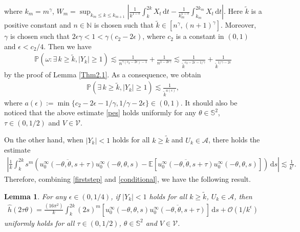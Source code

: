 \documentclass[reqno, 12pt]{amsart}
\newtheorem{Le}{Lemma}[section]
\numberwithin{equation}{section}
\begin{document}
where $k_m=m^\gamma$, $W_m=\sup_{k_m \le k \le k_{m+1}} \left|\frac{1}{k^{1-\epsilon}} \int_k^{2k} X_t \,\mathrm{d}t-\frac{1}{k_m^{1-\epsilon}} \int_{k_m}^{2k_m} X_t \,\mathrm{d}t \right|$. Here $\tilde k$ is a positive constant and $n \in \mathbb N$ is chosen such that $\tilde k \in [n^\gamma, (n+1)^\gamma]$. Moreover, $\gamma$ is chosen such that $2\epsilon\gamma<1<\gamma(c_2-2\epsilon)$, where $c_2$ is a constant in $ (0,1)$ and $\epsilon <c_2/4$. Then we have \begin{align*}
    \mathbb P(\omega: \exists \,k \ge \tilde k, |Y_{ k}| \ge 1) \lesssim \frac{1}{n^{\gamma(c_2-2\epsilon)-1}}+\frac{1}{n^{1-2\epsilon\gamma}} \lesssim \frac{1}{{\tilde k}^{c_2-2\epsilon-1/\gamma}}+\frac{1}{{\tilde k}^{1/\gamma-2\epsilon}} 
\end{align*} by the proof of Lemma \ref{Thm2.1}. As a consequence, we obtain \begin{align}\label{pes}
    \mathbb P(\exists \, k \ge \tilde k, |Y_{k}| \ge 1) \lesssim  \frac{1}{\tilde k^{a(\epsilon)}},
\end{align} where $a(\epsilon):=\min\{c_2-2\epsilon-1/\gamma,1/\gamma-2\epsilon\} \in (0,1)$. It should also be noticed that the above estimate \eqref{pes} holds uniformly for any $\theta \in \mathbb S^2$, $\tau \in (0,1/2)$ and $V \in\mathcal V.$

On the other hand, when $|Y_{k}| < 1$ holds for all $k \ge \tilde k$ and $U_{ k} \in \mathcal A$, there holds the estimate \begin{align}\label{conditional}
    \left|\frac{1}{ k}\int_{k}^{2 k}s^{m}(\overline{u_0^\infty(-\theta,\theta, s+\tau)} u_0^\infty(-\theta,\theta, s)-\mathbb{E}[\overline{u_0^\infty(-\theta,\theta, s+\tau)} u_0^\infty(-\theta,\theta,s)])\,\mathrm{d}s\right| \lesssim \frac{1}{k^{\epsilon}}.
\end{align} Therefore, combining \eqref{firststep} and \eqref{conditional}, we have the following result. \begin{Le}\label{zeroorder} For any $\epsilon \in (0,1/4)$, if $|Y_{k}| < 1$ holds for all $k \ge \tilde k$, $U_{ k} \in \mathcal A$, then \begin{align}\label{4.12}
	\widehat{h}(2\tau\theta)=\frac{(16\pi^2)}{k}\int_k^{2k}(2s)^{m} [u_0^\infty(-\theta,\theta, s) \overline{u_0^\infty(-\theta,\theta, s+\tau)}]\,\mathrm{d}s+\mathcal{O}(1/k^\epsilon)
\end{align} uniformly holds for all $\tau \in (0,1/2)$, $\theta \in \mathbb S^2$ and $V \in \mathcal V$. \end{Le}
\end{document}
